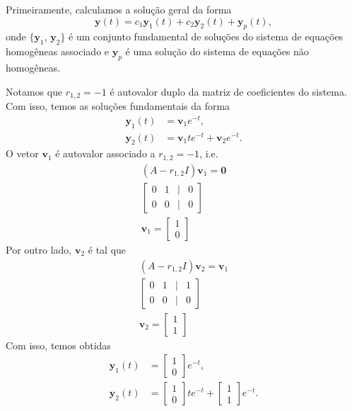 \begin{resol}
  Primeiramente, calculamos a solução geral da forma
  \begin{equation}
    \pmb{y}(t) = c_1\pmb{y}_1(t) + c_2\pmb{y}_2(t) + \pmb{y}_p(t),
  \end{equation}
  onde $\{\pmb{y}_1$, $\pmb{y}_2\}$ é um conjunto fundamental de soluções do sistema de equações homogêneas associado e $\pmb{y}_p$ é uma solução do sistema de equações não homogêneas.

  Notamos que $r_{1,2} = -1$ é autovalor duplo da matriz de coeficientes do sistema. Com isso, temos as soluções fundamentais da forma
  \begin{align}
    \pmb{y}_1(t) &= \pmb{v}_1e^{-t}, \\
    \pmb{y}_2(t) &= \pmb{v}_1te^{-t} + \pmb{v}_2e^{-t}.
  \end{align}
  O vetor $\pmb{v}_1$ é autovalor associado a $r_{1,2}=-1$, i.e.
  \begin{gather}
    (A-r_{1,2}I)\pmb{v}_1 = \pmb{0} \\
    \begin{bmatrix}
      0 & 1 & | & 0 \\
      0 & 0 & | & 0
    \end{bmatrix}\\
    \pmb{v}_1 =
    \begin{bmatrix}
      1\\
      0
    \end{bmatrix}
  \end{gather}
  Por outro lado, $\pmb{v}_2$ é tal que
  \begin{gather}
    (A-r_{1,2}I)\pmb{v}_2 = \pmb{v}_1 \\
    \begin{bmatrix}
      0 & 1 & | & 1 \\
      0 & 0 & | & 0
    \end{bmatrix}\\
    \pmb{v}_2 =
    \begin{bmatrix}
      1\\
      1
    \end{bmatrix}
  \end{gather}
  Com isso, temos obtidas
    \begin{align}
    \pmb{y}_1(t) &=
                   \begin{bmatrix}
                     1 \\ 0
                   \end{bmatrix}e^{-t}, \\
    \pmb{y}_2(t) &=
                   \begin{bmatrix}
                     1 \\
                     0
                   \end{bmatrix}te^{-t} +
      \begin{bmatrix}
        1 \\ 1
      \end{bmatrix}e^{-t}.
    \end{align}


\end{resol}
